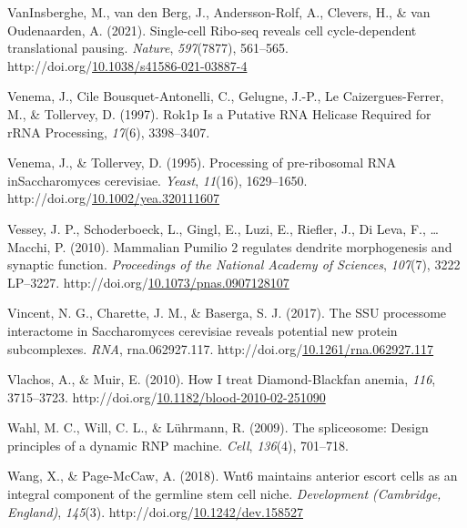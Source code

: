 \documentclass[12pt,oneside]{reedthesis}
\newlength{\cslhangindent}
\newenvironment{CSLReferences}[2] %
 {%
  \setlength{\parindent}{0pt}
  \ifodd #1 \everypar{\setlength{\hangindent}{\cslhangindent}}\ignorespaces\fi
  \ifnum #2 > 0
  \setlength{\parskip}{#2\baselineskip}
  \fi
 }%
 {}
\begin{document}
\begin{CSLReferences}{1}{0}
\leavevmode{}%
VanInsberghe, M., van den Berg, J., Andersson-Rolf, A., Clevers, H., \& van Oudenaarden, A. (2021). Single-cell {Ribo-seq} reveals cell cycle-dependent translational pausing. \emph{Nature}, \emph{597}(7877), 561--565. http://doi.org/\href{https://doi.org/10.1038/s41586-021-03887-4}{10.1038/s41586-021-03887-4}

\leavevmode{}%
Venema, J., Cile Bousquet-Antonelli, C., Gelugne, J.-P., Le Caizergues-Ferrer, M., \& Tollervey, D. (1997). Rok1p {Is} a {Putative RNA Helicase Required} for {rRNA Processing}, \emph{17}(6), 3398--3407.

\leavevmode{}%
Venema, J., \& Tollervey, D. (1995). Processing of pre-ribosomal {RNA inSaccharomyces} cerevisiae. \emph{Yeast}, \emph{11}(16), 1629--1650. http://doi.org/\href{https://doi.org/10.1002/yea.320111607}{10.1002/yea.320111607}

\leavevmode{}%
Vessey, J. P., Schoderboeck, L., Gingl, E., Luzi, E., Riefler, J., Di Leva, F., \ldots{} Macchi, P. (2010). Mammalian {Pumilio} 2 regulates dendrite morphogenesis and synaptic function. \emph{Proceedings of the National Academy of Sciences}, \emph{107}(7), 3222 LP--3227. http://doi.org/\href{https://doi.org/10.1073/pnas.0907128107}{10.1073/pnas.0907128107}

\leavevmode{}%
Vincent, N. G., Charette, J. M., \& Baserga, S. J. (2017). The {SSU} processome interactome in {Saccharomyces} cerevisiae reveals potential new protein subcomplexes. \emph{RNA}, rna.062927.117. http://doi.org/\href{https://doi.org/10.1261/rna.062927.117}{10.1261/rna.062927.117}

\leavevmode{}%
Vlachos, A., \& Muir, E. (2010). How {I} treat {Diamond-Blackfan} anemia, \emph{116}, 3715--3723. http://doi.org/\href{https://doi.org/10.1182/blood-2010-02-251090}{10.1182/blood-2010-02-251090}

\leavevmode{}%
Wahl, M. C., Will, C. L., \& Lührmann, R. (2009). The spliceosome: Design principles of a dynamic {RNP} machine. \emph{Cell}, \emph{136}(4), 701--718.

\leavevmode{}%
Wang, X., \& Page-McCaw, A. (2018). Wnt6 maintains anterior escort cells as an integral component of the germline stem cell niche. \emph{Development (Cambridge, England)}, \emph{145}(3). http://doi.org/\href{https://doi.org/10.1242/dev.158527}{10.1242/dev.158527}


\end{CSLReferences}
\end{document}
